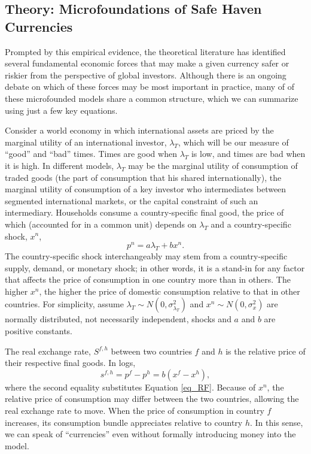 
\subsection{Theory: Microfoundations of Safe Haven Currencies}

Prompted by this empirical evidence, the theoretical literature has
identified several fundamental economic forces that may make a given
currency safer or riskier from the perspective of global investors.
Although there is an ongoing debate on which of these forces may be
most important in practice, many of of these microfounded models share
a common structure, which we can summarize using just a few key
equations.

Consider a world economy in which international assets are priced by
the marginal utility of an international investor, $\lambda_T$, which
will be our measure of ``good'' and ``bad'' times. Times are good when
$\lambda_T$ is low, and times are bad when it is high. In different
models, $\lambda_T$ may be the marginal utility of consumption of
traded goods (the part of consumption that his shared
internationally), the marginal utility of consumption of a key
investor who intermediates between segmented international markets, or
the capital constraint of such an intermediary. Households consume a
country-specific final good, the price of which (accounted for in a
common unit) depends on $\lambda_T$ and a country-specific shock,
$x^n$,
\begin{equation}
  p^{n} = a\lambda_{T} + b x^{n}.  
  \label{eq_RF}
\end{equation}%
The country-specific shock interchangeably may stem from a
country-specific supply, demand, or monetary shock; in other words, it
is a stand-in for any factor that affects the price of consumption in
one country more than in others. The higher $x^{n}$, the higher the
price of domestic consumption relative to that in other countries. For
simplicity, assume $\lambda _{T}\sim N(0,\sigma^2_{\lambda_{T}})$ and
$x^{n} \sim N(0,\sigma^2_x) $ are normally distributed, not
necessarily independent, shocks and $a$ and $b$ are positive constants.

The real exchange rate, $S^{f, h}$ between two countries $f$ and $h$ 
is the relative price of their respective final goods. In logs,
\begin{equation}
  s^{f,h} 
  = p^f - p^h 
  = b(x^f - x^h),
\label{eq_RER}
\end{equation}
where the second equality substitutes Equation \eqref{eq_RF}. Because 
of $x^{n}$, the relative price of consumption may differ between the 
two countries, allowing the real exchange rate to move. When the price of
consumption in country $f$ increases, its consumption bundle
appreciates relative to country $h$. In this sense, we can speak of
``currencies'' even without formally introducing money into the model.

